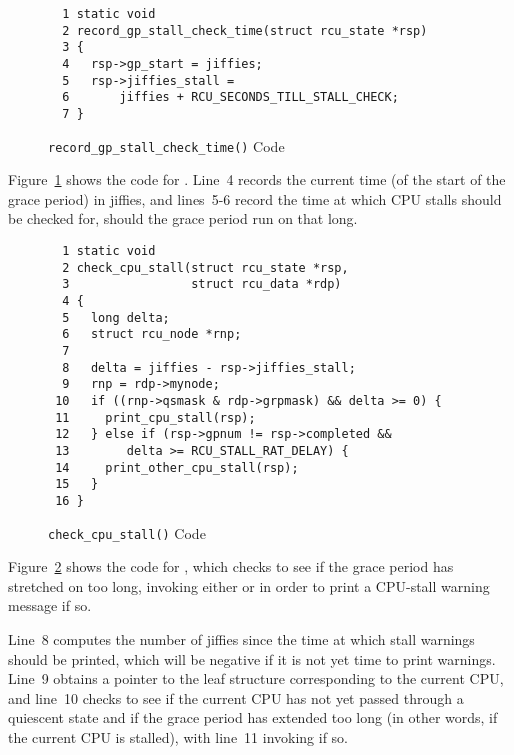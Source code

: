 \begin{figure}[tbp]
{ \scriptsize
\begin{verbatim}
  1 static void
  2 record_gp_stall_check_time(struct rcu_state *rsp)
  3 {
  4   rsp->gp_start = jiffies;
  5   rsp->jiffies_stall =
  6       jiffies + RCU_SECONDS_TILL_STALL_CHECK;
  7 }
\end{verbatim}
}
\caption{{\tt record\_gp\_stall\_check\_time()} Code}
\label{fig:app:rcuimpl:rcutreewt:Code for record-gp-stall-check-time}
\end{figure}

Figure~\ref{fig:app:rcuimpl:rcutreewt:Code for record-gp-stall-check-time}
shows the code for .
Line~4 records the current time (of the start of the grace period)
in jiffies, and lines~5-6 record the time at which CPU stalls should
be checked for, should the grace period run on that long.

\begin{figure}[tbp]
{ \scriptsize
\begin{verbatim}
  1 static void
  2 check_cpu_stall(struct rcu_state *rsp,
  3                 struct rcu_data *rdp)
  4 {
  5   long delta;
  6   struct rcu_node *rnp;
  7
  8   delta = jiffies - rsp->jiffies_stall;
  9   rnp = rdp->mynode;
 10   if ((rnp->qsmask & rdp->grpmask) && delta >= 0) {
 11     print_cpu_stall(rsp);
 12   } else if (rsp->gpnum != rsp->completed &&
 13        delta >= RCU_STALL_RAT_DELAY) {
 14     print_other_cpu_stall(rsp);
 15   }
 16 }
\end{verbatim}
}
\caption{{\tt check\_cpu\_stall()} Code}
\label{fig:app:rcuimpl:rcutreewt:Code for check-cpu-stall}
\end{figure}

Figure~\ref{fig:app:rcuimpl:rcutreewt:Code for check-cpu-stall}
shows the code for , which checks to see
if the grace period has stretched on too long, invoking either
 or  in order
to print a CPU-stall warning message if so.

Line~8 computes the number of jiffies since the time at which stall
warnings should be printed, which will be negative if it is not
yet time to print warnings.
Line~9 obtains a pointer to the leaf 
structure corresponding to the current CPU,
and line~10 checks to see if the current CPU has not yet passed through
a quiescent state and if the grace period has extended too long
(in other words, if the current CPU is stalled),
with line~11 invoking  if so.

